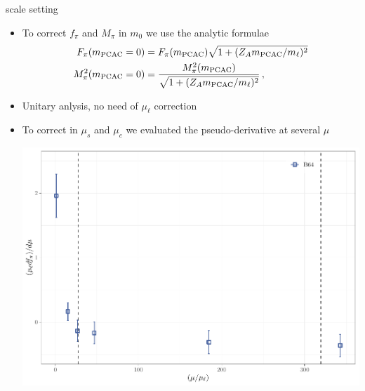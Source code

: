\documentclass[xcolor={dvipsnames,table}]{beamer}
\begin{document}
\begin{frame}{scale setting}
  \begin{itemize}
    \item To correct $f_\pi$ and $M_\pi$ in $m_0$ we use the analytic formulae
          \begin{align*}
            F_{\pi}(m_{\rm PCAC}=0)   & =F_{\pi}(m_{\rm PCAC})\sqrt{1+(Z_A m_{\rm PCAC}/ m_\ell)^2}               \\
            M_{\pi}^2(m_{\rm PCAC}=0) & = \frac{M_{\pi}^2(m_{\rm PCAC})}{\sqrt{1+(Z_A m_{\rm PCAC}/m_\ell)^2}}\,,
          \end{align*}
    \item<2-> Unitary anlysis, no need of $\mu_\ell$ correction
    \item<3->  To correct in $\mu_s$ and $\mu_c$ we evaluated the pseudo-derivative at several $\mu$
      \begin{center}
        \includegraphics[scale=0.5]{plots/der_fpi_B64.pdf}
      \end{center}
  \end{itemize}
\end{frame}
\end{document}
